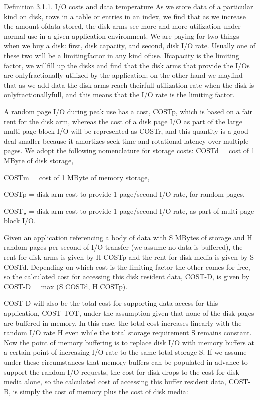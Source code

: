\documentclass[a4paper,12pt,notitlepage,twoside,openright]{article}
\begin{document}
Definition 3.1.1. I/O costs and data temperature As we store data of a
particular kind on disk, rows in a table or entries in an index, we find
that as we increase the amount ofdata stored, the disk arms see more and
more utilization under normal use in a given application environment. We
are paying for two things when we buy a disk: first, disk capacity, and
second, disk I/O rate. Usually one of these two will be a limitingfactor
in any kind ofuse. Ifcapacity is the limiting factor, we willfill up the
disks and find that the disk arms that provide the I/Os are
onlyfractionally utilized by the application; on the other hand we
mayfind that as we add data the disk arms reach theirfull utilization
rate when the disk is onlyfractionallyfull, and this means that the I/O
rate is the limiting factor.

A random page I/O during peak use has a cost, COSTp, which is based on a
fair rent for the disk arm, whereas the cost of a disk page I/O as part
of the large multi-page block I/O will be represented as COSTr, and this
quantity is a good deal smaller because it amortizes seek time and
rotational latency over multiple pages. We adopt the following
nomenclature for storage costs: COSTd = cost of 1 MByte of disk storage,

COSTm = cost of 1 MByte of memory storage,

COSTp = disk arm cost to provide 1 page/second I/O rate, for random
pages,

COST„ = disk arm cost to provide 1 page/second I/O rate, as part of
multi-page block I/O.

Given an application referencing a body of data with S MBytes of storage
and H random pages per second of I/O transfer (we assume no data is
buffered), the rent for disk arms is given by H COSTp and the rent for
disk media is given by S COSTd. Depending on which cost is the limiting
factor the other comes for free, so the calculated cost for accessing
this disk resident data, COST-D, is given by COST-D = max (S COSTd, H
COSTp).

COST-D will also be the total cost for supporting data access for this
application, COST-TOT, under the assumption given that none of the disk
pages are buffered in memory. In this case, the total cost increases
linearly with the random I/O rate H even while the total storage
requirement S remains constant. Now the point of memory buffering is to
replace disk I/O with memory buffers at a certain point of increasing
I/O rate to the same total storage S. If we assume under these
circumstances that memory buffers can be populated in advance to support
the random I/O requests, the cost for disk drops to the cost for disk
media alone, so the calculated cost of accessing this buffer resident
data, COST-B, is simply the cost of memory plus the cost of disk media:
\end{document}
